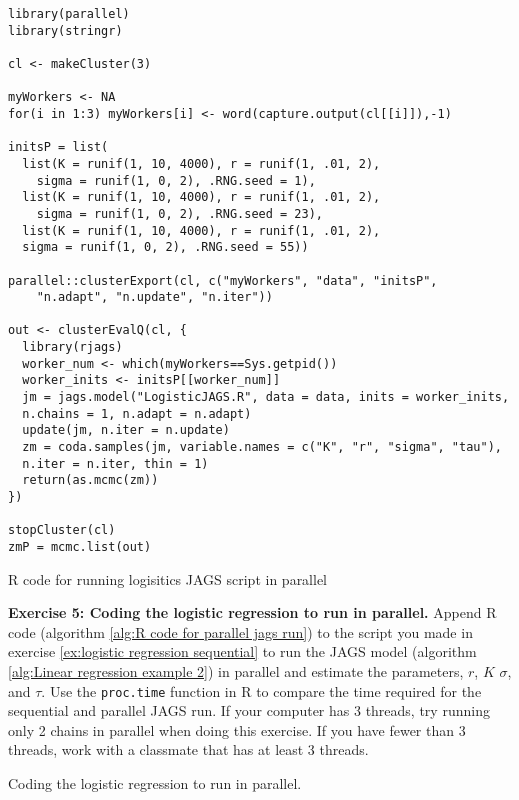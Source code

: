 \documentclass[12pt,english]{article}
\begin{document}
\begin{algorithm}
\begin{Verbatim}[frame=single]
library(parallel)
library(stringr)

cl <- makeCluster(3)

myWorkers <- NA
for(i in 1:3) myWorkers[i] <- word(capture.output(cl[[i]]),-1)

initsP = list(
  list(K = runif(1, 10, 4000), r = runif(1, .01, 2),
    sigma = runif(1, 0, 2), .RNG.seed = 1),
  list(K = runif(1, 10, 4000), r = runif(1, .01, 2), 
    sigma = runif(1, 0, 2), .RNG.seed = 23),
  list(K = runif(1, 10, 4000), r = runif(1, .01, 2), 
  sigma = runif(1, 0, 2), .RNG.seed = 55))

parallel::clusterExport(cl, c("myWorkers", "data", "initsP", 
	"n.adapt", "n.update", "n.iter"))

out <- clusterEvalQ(cl, {
  library(rjags)
  worker_num <- which(myWorkers==Sys.getpid())
  worker_inits <- initsP[[worker_num]]
  jm = jags.model("LogisticJAGS.R", data = data, inits = worker_inits, 
  n.chains = 1, n.adapt = n.adapt)
  update(jm, n.iter = n.update)
  zm = coda.samples(jm, variable.names = c("K", "r", "sigma", "tau"), 
  n.iter = n.iter, thin = 1)
  return(as.mcmc(zm))
}) 

stopCluster(cl)
zmP = mcmc.list(out)
\end{Verbatim}
\caption{R code for running logisitics JAGS script in parallel}
\label{alg:R code for parallel jags run}
\end{algorithm}

\belowcaptionskip=-40pt
\begin{exercise}
\begin{mdframed}
\doublespacing
\textbf{Exercise 5: Coding the logistic regression to run in parallel.}  Append R code (algorithm \ref{alg:R code for parallel jags run}) to the script you made in exercise \ref{ex:logistic regression sequential} to run the JAGS model (algorithm \ref{alg:Linear regression example 2}) in parallel and estimate the parameters, $r$, $K$ $\sigma$, and $\tau$. Use the \texttt{proc.time} function in R to compare the time required for the sequential and parallel JAGS run. If your computer has 3 threads, try running only 2 chains in parallel when doing this exercise. If you have fewer than 3 threads, work with a classmate that has at least 3 threads.
\end{mdframed}
\captionsetup{textformat=empty, labelformat=empty}
\caption[Coding the logistic regression to run in parallel]{Coding the logistic regression to run in parallel.}
\label{ex:logistic regression parallel}
\end{exercise}
\belowcaptionskip=0pt
\end{document}
